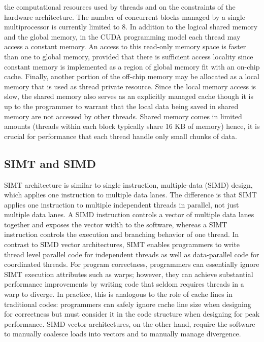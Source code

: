 the computational resources used by threads and on the constraints of the hardware architecture.
The number of concurrent blocks managed by a single multiprocessor is currently limited to 8.\newline
   In addition to the logical shared memory and the global memory, in the CUDA programming model each thread may access a constant memory.
 An access to this read-only memory space is faster than one to global memory, provided that there is sufficient access locality since
constant memory is implemented as a region of global memory fit with an on-chip cache.
Finally, another portion of the off-chip memory may be allocated as a local memory that is used as thread private resource.
Since the local memory access is slow, the shared memory also serves as an explicitly managed cache though it is up to the
programmer to warrant that the local data being saved in shared memory are not accessed by other
threads. Shared memory comes in limited amounts (threads within each block typically share 16 KB of memory) hence,
it is crucial for performance that each thread handle only small chunks of data.

\subsection{SIMT and SIMD}
   SIMT architecture is similar to single instruction, multiple-data (SIMD) design, which applies one instruction to multiple data lanes.\newline
 The difference is that SIMT applies one instruction to multiple independent threads in parallel, not just multiple data lanes.
A SIMD instruction controls a vector of multiple data lanes together and exposes the vector width to the software, whereas a SIMT instruction
controls the execution and branching behavior of one thread.\newline
   In contrast to SIMD vector architectures, SIMT enables programmers to write thread level parallel code for independent threads
as well as data-parallel code for coordinated threads.\newline
For program correctness, programmers can essentially ignore SIMT execution attributes such as warps; however, they can
achieve substantial performance improvements by writing code that seldom requires threads in a warp to diverge. In practice, this
is analogous to the role of cache lines in traditional codes: programmers can safely ignore cache line size when designing for
correctness but must consider it in the code structure when designing for peak performance.\newline 
SIMD vector architectures, on the other hand, require the software to manually coalesce loads into vectors and to manually manage
divergence.







